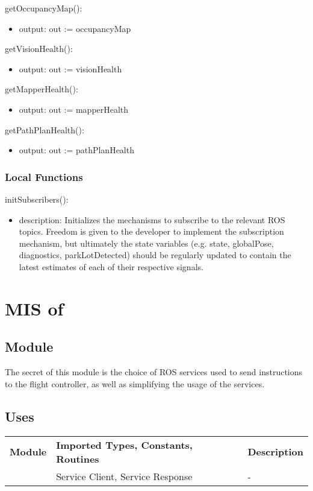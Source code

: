 \documentclass[12pt, titlepage]{article}
\begin{document}
\noindent getOccupancyMap():
\begin{itemize}
\item output: out := occupancyMap 
\end{itemize}
\noindent getVisionHealth():
\begin{itemize}
\item output: out := visionHealth 
\end{itemize}
\noindent getMapperHealth():
\begin{itemize}
\item output: out := mapperHealth 
\end{itemize}
\noindent getPathPlanHealth():
\begin{itemize}
\item output: out := pathPlanHealth 
\end{itemize}
\subsubsection{Local Functions}
\noindent initSubscribers():
\begin{itemize}
\item description: Initializes the mechanisms to subscribe to the relevant ROS topics. Freedom is given to the developer to implement the subscription mechanism, but ultimately the state variables (e.g. state, globalPose, diagnostics, parkLotDetected) should be regularly updated to contain the latest estimates of each of their respective signals.
\end{itemize}
\newpage


\section{MIS of } \label{MIS_DDC_SERVICE_INTERFACE} 
\subsection{Module}
The secret of this module is the choice of ROS services used to send instructions to the flight controller, as well as simplifying the usage of the services.
\subsection{Uses}
\begin{center}
\begin{tabular}{p{2 cm} p{5cm} p{6.5cm} } 
\hline
\textbf{Module} & \textbf{Imported Types, Constants, Routines} & \textbf{Description} \\
\nameref{ROS} & Service Client, Service Response & -\\
\hline
\hline
\end{tabular}
\end{center}
\end{document}
